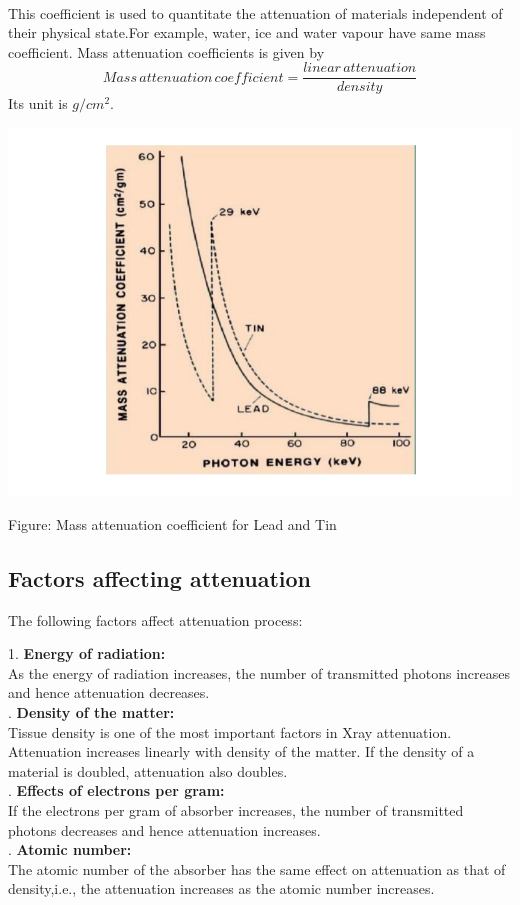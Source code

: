 \documentclass[12pt,a4paper]{article}%
\begin{document}
\begin{flushleft}
		\paragraph{}
		This coefficient is used to quantitate the
		attenuation of materials independent of their
		physical state.For example, water, ice and water vapour have same mass coefficient. Mass attenuation coefficients is given by
		$$Mass \,attenuation\, coefficient=\frac{linear\, attenuation}{density} $$ 
		Its unit is $g/cm^2$.
		\begin{center}
			{\includegraphics[width=0.80 \textwidth]{./images/NKK2.png}}
		\end{center}
		\begin{center}
			Figure: Mass attenuation coefficient for Lead and Tin
		\end{center}
		\subsection{Factors affecting attenuation}  
		The following factors affect attenuation process:\\\bigskip
		
		1. \textbf{Energy of radiation:}\\\bigskip
		As the energy of radiation increases, the number of transmitted photons increases and hence attenuation decreases.\\. \textbf{Density of the matter:}\\\bigskip
		Tissue density is one of the most important factors in Xray
		attenuation. Attenuation increases linearly with density of the matter. If the density of a material is doubled, attenuation also doubles.\\. \textbf{Effects of electrons per gram:}\\\bigskip
		If the electrons per gram of absorber increases, the number of transmitted photons decreases and hence attenuation increases.\\. \textbf{Atomic number:}\\\bigskip
		The atomic number of the absorber has the same effect on attenuation as that of density,i.e., the attenuation increases as the atomic number increases.
		
	\end{flushleft}
	\pagebreak
\end{document}
